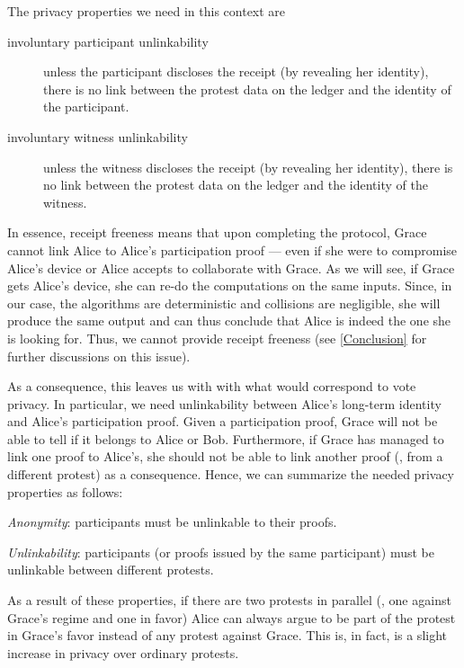 The privacy properties we need in this context are
\begin{description}
  \item[involuntary participant unlinkability] unless the participant discloses 
    the receipt (by revealing her identity), there is no link between the 
    protest data on the ledger and the identity of the participant.

  \item[involuntary witness unlinkability] unless the witness discloses the 
    receipt (by revealing her identity), there is no link between the protest 
    data on the ledger and the identity of the witness.
\end{description}
In essence, receipt freeness means that upon completing the protocol, Grace cannot link Alice to Alice's participation proof --- even if she were to compromise Alice's device or Alice accepts to collaborate with Grace.
As we will see, if Grace gets Alice's device, she can re-do the computations on the same inputs.
Since, in our case, the algorithms are deterministic and collisions are negligible, she will produce the same output and can thus conclude that Alice is indeed the one she is looking for.
Thus, we cannot provide receipt freeness (see \cref{Conclusion} for further discussions on this issue).

As a consequence, this leaves us with with what would correspond to vote privacy.
In particular, we need unlinkability between Alice's long-term identity and Alice's participation proof.
Given a participation proof, Grace will not be able to tell if it belongs to Alice or Bob.
Furthermore, if Grace has managed to link one proof to Alice's, she should not be able to link another proof (\eg, from a different protest) as a consequence.
Hence, we can summarize the needed privacy properties as follows:
\begin{requirements}[P]
\item\label{ProofUnlink} \emph{Anonymity}: participants must be unlinkable to their proofs.
\item\label{ProtestUnlink} \emph{Unlinkability}: participants (or proofs issued by the same participant) must be unlinkable between different protests.
\end{requirements}

As a result of these properties, if there are two protests in parallel (\eg, one against Grace's regime and one in favor) Alice can always argue to be part of the protest in Grace's favor instead of any protest against Grace.
This is, in fact, is a slight increase in privacy over ordinary protests.

